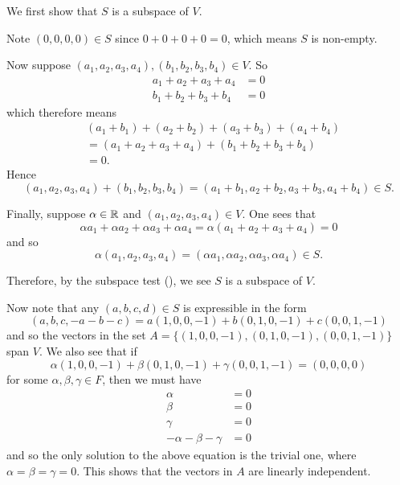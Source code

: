\begin{questions}
\begin{partquestions}{\alph*}
        \item We first show that $S$ is a subspace of $V$.

        Note $(0, 0, 0, 0) \in S$ since $0 + 0 + 0 + 0 = 0$, which means $S$ is non-empty.

        Now suppose $(a_1, a_2, a_3, a_4), (b_1, b_2, b_3, b_4) \in V$. So
        \begin{align*}
            a_1 + a_2 + a_3 + a_4 &= 0\\
            b_1 + b_2 + b_3 + b_4 &= 0
        \end{align*}
        which therefore means
        \begin{align*}
            &(a_1 + b_1) + (a_2 + b_2) + (a_3 + b_3) + (a_4 + b_4)\\
            &= (a_1 + a_2 + a_3 + a_4) + (b_1 + b_2 + b_3 + b_4)\\
            &= 0.
        \end{align*}
        Hence
        \[
            (a_1, a_2, a_3, a_4) + (b_1, b_2, b_3, b_4) = (a_1 + b_1, a_2 + b_2, a_3 + b_3, a_4 + b_4) \in S.
        \]

        Finally, suppose $\alpha \in \mathbb{R}$ and $(a_1, a_2, a_3, a_4) \in V$. One sees that
        \[
            \alpha a_1 + \alpha a_2 + \alpha a_3 + \alpha a_4 = \alpha(a_1 + a_2 + a_3 + a_4) = 0
        \]
        and so
        \[
            \alpha(a_1, a_2, a_3, a_4) = (\alpha a_1, \alpha a_2 , \alpha a_3, \alpha a_4) \in S.
        \]

        Therefore, by the subspace test (), we see $S$ is a subspace of $V$.

        Now note that any $(a, b, c, d) \in S$ is expressible in the form
        \[
            (a, b, c, -a-b-c) = a(1, 0, 0, -1) + b(0, 1, 0, -1) + c(0, 0, 1, -1)
        \]
        and so the vectors in the set $A = \{(1, 0, 0, -1), (0, 1, 0, -1), (0, 0, 1, -1)\}$ span $V$. We also see that if
        \[
            \alpha(1, 0, 0, -1) + \beta(0, 1, 0, -1) + \gamma(0, 0, 1, -1) = (0, 0, 0, 0)
        \]
        for some $\alpha, \beta, \gamma \in F$, then we must have
        \begin{align*}
            \alpha &= 0\\
            \beta &= 0\\
            \gamma &= 0\\
            -\alpha - \beta - \gamma &= 0
        \end{align*}
        and so the only solution to the above equation is the trivial one, where $\alpha = \beta = \gamma = 0$. This shows that the vectors in $A$ are linearly independent.


\end{partquestions}
\end{questions}
